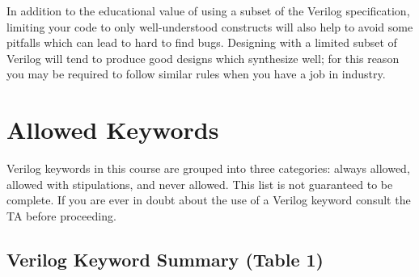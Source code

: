 \documentclass[11pt]{article}
\begin{document}
In addition to the educational value of using a subset of the Verilog specification, limiting your code to only
well-understood constructs will also help to avoid some pitfalls which can lead to hard to find bugs.
Designing with a limited subset of Verilog will tend to produce good designs which synthesize well; for this
reason you may be required to follow similar rules when you have a job in industry.

\section{Allowed Keywords}

Verilog keywords in this course are grouped into three categories: always allowed, allowed with stipulations,
and never allowed. This list is not guaranteed to be complete. If you are ever in doubt about the use of a
Verilog keyword consult the TA before proceeding.

\vspace{0.75em}

\subsection*{Verilog Keyword Summary (Table 1)}
\end{document}
